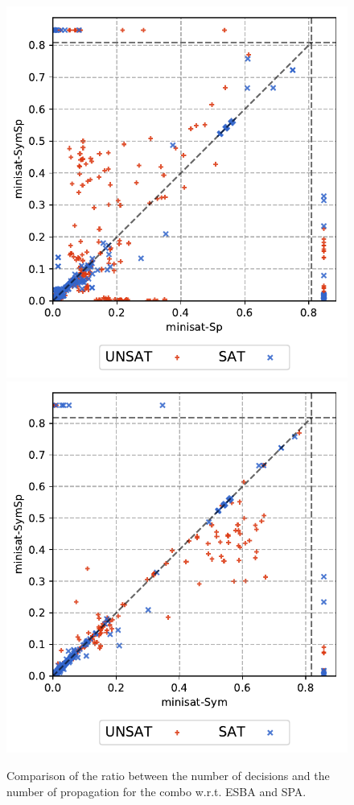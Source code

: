 \begin{center}
\begin{figure}[!htbp]
 \centering
  \includegraphics[scale=0.6]{img/full-INFGB-ratio-vsspfs.pdf}%
 \includegraphics[scale=0.6]{img/full-INFGB-ratio-vscosy.pdf}%
 \caption{Comparison of the ratio between the number of decisions and the number of propagation for the combo w.r.t. ESBA and SPA.}
 \label{fig:ratio}
\end{figure}
\end{center}
